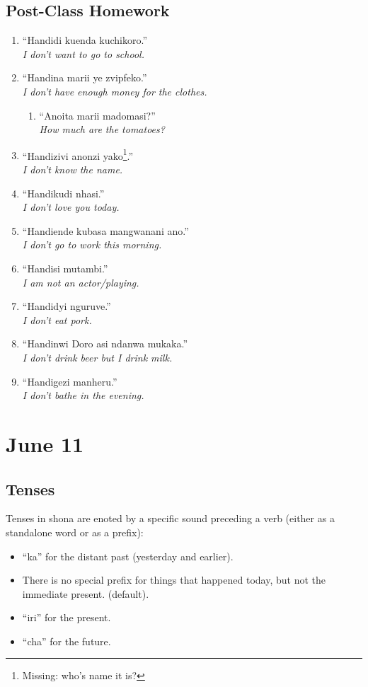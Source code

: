 \documentclass[12pt]{article}
\newcommand{\tl}[2]{``#1''\\\textit{#2}}
\begin{document}
\subsection{Post-Class Homework}
\begin{enumerate}
\item \tl{Handidi kuenda kuchikoro.}{I don't want to go to school.}
\item \tl{Handina marii ye zvipfeko.}{I don't have enough money for the clothes.}
  \begin{enumerate}
  \item \tl{Anoita marii madomasi?}{How much are the tomatoes?}
  \end{enumerate}
\item \tl{Handizivi anonzi yako\footnote{Missing: who's name it is?}.}{I don't know the name.}
\item \tl{Handikudi nhasi.}{I don't love you today.}
\item \tl{Handiende kubasa mangwanani ano.}{I don't go to work this morning.}
\item \tl{Handisi mutambi.}{I am not an actor/playing.}
\item \tl{Handidyi nguruve.}{I don't eat pork.}
\item \tl{Handinwi Doro asi ndanwa mukaka.}{I don't drink beer but I drink milk.}
\item \tl{Handigezi manheru.}{I don't bathe in the evening.}
\end{enumerate}

\section{June 11}
\subsection{Tenses}
Tenses in shona are enoted by a specific sound preceding a verb (either as a standalone word or as a prefix):
\begin{itemize}
\item ``ka'' for the distant past (yesterday and earlier).
\item There is no special prefix for things that happened today, but not the immediate present. (default).
\item ``iri'' for the present.
\item ``cha'' for the future.
\end{itemize}
\end{document}
